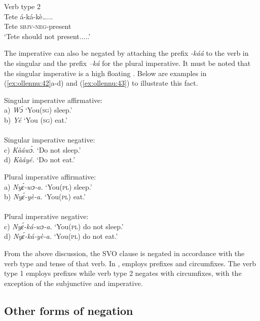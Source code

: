\documentclass[output=paper
,newtxmath
,modfonts
,nonflat]{langsci/langscibook}
\begin{document}
\begin{minipage}{.5\textwidth}



\ea  Verb type 2 \\\label{ex:ollennu:41}
\gll Tete \'a-k\'a-k\`e…...\\
Tete \textsc{sbjv}-\textsc{neg}-present\\
\glt `Tete should not present.....'
\z
\end{minipage}

The imperative can also be negated by attaching the prefix \textit{-k\'a\'a} to the verb in the singular and the prefix \textit{–k\'a} for the plural imperative. It must be noted that the singular imperative is a high floating . Below are examples in (\ref{ex:ollennu:42}a-d) and (\ref{ex:ollennu:43}) to illustrate this fact.

\ea \label{ex:ollennu:42}

Singular imperative affirmative:\\
a) \textit{W\'ɔ} \enspace  `You(\textsc{sg}) sleep.' \\
b) \textit{Y\'e} \enspace `You (\textsc{sg}) eat.'\\\\
Singular imperative negative:\\
c) \textit{K\`a\'aw\'ɔ}. \enspace `Do not sleep.' \\
d) \textit{K\`a\'ay\'e.} \enspace `Do not eat.'
\z

\ea \label{ex:ollennu:43} Plural imperative affirmative:\\
a) \textit{Ny\'ɛ-wɔ-a.} \enspace `You(\textsc{pl}) sleep.'\\
b)  \textit{Ny\'ɛ-y\`e-a.} \enspace `You(\textsc{pl}) eat.'\\\\
Plural imperative negative:\\
c) \textit{Ny\'ɛ-k\'a-wɔ-a.} \enspace `You(\textsc{pl}) do not sleep.' \\
d) \textit{Ny\'ɛ-k\'a-y\`e-a.} \enspace `You(\textsc{pl}) do not eat.'
\z

From the above discussion, the SVO clause is negated in accordance with the verb type and tense of that verb. In ,  employs prefixes and circumfixes. The verb type 1 employs prefixes while verb type 2 negates with circumfixes, with the exception of the subjunctive and imperative.

\subsection{\label{sec:ollennu:2.4} Other forms of negation}
\end{document}
